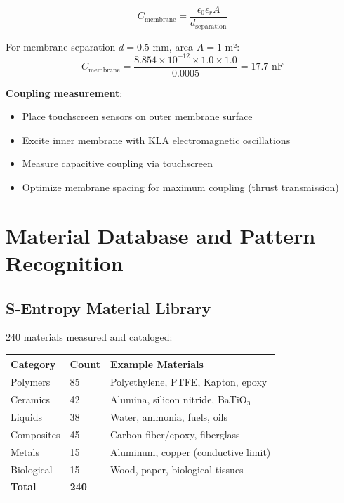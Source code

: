 \documentclass[12pt,a4paper]{article}
\begin{document}
\begin{equation}
C_{\text{membrane}} = \frac{\epsilon_0 \epsilon_r A}{d_{\text{separation}}}
\end{equation}

For membrane separation $d = 0.5$ mm, area $A = 1$ m²:
\begin{equation}
C_{\text{membrane}} = \frac{8.854 \times 10^{-12} \times 1.0 \times 1.0}{0.0005} = 17.7 \text{ nF}
\end{equation}

\textbf{Coupling measurement}:
\begin{itemize}
\item Place touchscreen sensors on outer membrane surface
\item Excite inner membrane with KLA electromagnetic oscillations
\item Measure capacitive coupling via touchscreen
\item Optimize membrane spacing for maximum coupling (thrust transmission)
\end{itemize}

\section{Material Database and Pattern Recognition}

\subsection{S-Entropy Material Library}

240 materials measured and cataloged:

\begin{center}
\begin{tabular}{|l|l|l|}
\hline
\textbf{Category} & \textbf{Count} & \textbf{Example Materials} \\
\hline
Polymers & 85 & Polyethylene, PTFE, Kapton, epoxy \\
Ceramics & 42 & Alumina, silicon nitride, BaTiO₃ \\
Liquids & 38 & Water, ammonia, fuels, oils \\
Composites & 45 & Carbon fiber/epoxy, fiberglass \\
Metals & 15 & Aluminum, copper (conductive limit) \\
Biological & 15 & Wood, paper, biological tissues \\
\hline
\textbf{Total} & \textbf{240} & — \\
\hline
\end{tabular}
\end{center}
\end{document}
